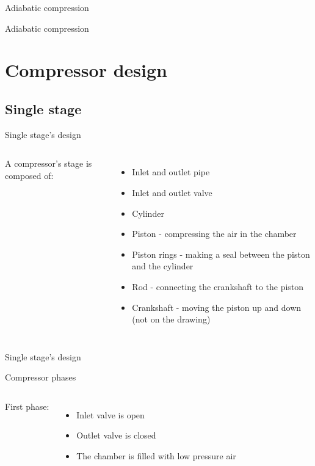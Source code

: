 \documentclass[aspectratio=1610,english,12pt]{beamer}
\begin{document}
	\begin{frame}{Adiabatic compression}
	\end{frame}

	\begin{frame}{Adiabatic compression}
	\end{frame}

\section{Compressor design}

\subsection{Single stage}

	\begin{frame}{Single stage's design}
		\begin{columns}[onlytextwidth]
				A compressor's stage is composed of:
				\begin{itemize}
					\item Inlet and outlet pipe
					\item Inlet and outlet valve
					\item Cylinder
					\item Piston - compressing the air in the chamber
					\item Piston rings - making a seal between the piston and the cylinder 
					\item Rod - connecting the crankshaft to the piston
					\item Crankshaft - moving the piston up and down (not on the drawing)
				\end{itemize}
		\end{columns}
	\end{frame}

	\begin{frame}{Single stage's design}
	\end{frame}

	\begin{frame}{Compressor phases}
		\begin{columns}[onlytextwidth]
				First phase:
				\begin{itemize}
					\item Inlet valve is open
					\item Outlet valve is closed
					\item The chamber is filled with low pressure air
				\end{itemize}
		\end{columns}
	\end{frame}
\end{document}
